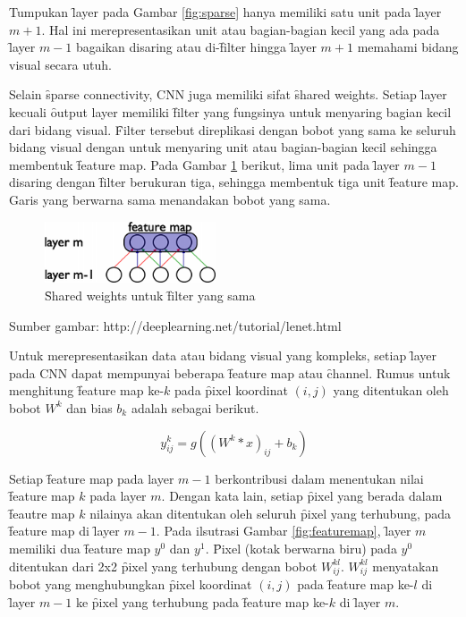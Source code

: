 Tumpukan \f{layer} pada Gambar \ref{fig:sparse} hanya memiliki satu unit pada \f{layer} $m + 1$. Hal ini merepresentasikan unit atau bagian-bagian kecil yang ada pada \f{layer} $m - 1$ bagaikan disaring atau di-\f{filter} hingga \f{layer} $m + 1$ memahami bidang visual secara utuh. 

Selain \f{sparse connectivity}, CNN juga memiliki sifat \f{shared weights}. Setiap \f{layer} kecuali \f{output layer} memiliki \f{filter} yang fungsinya untuk menyaring bagian kecil dari bidang visual. \f{Filter} tersebut direplikasi dengan bobot yang sama ke seluruh bidang visual dengan untuk menyaring unit atau bagian-bagian kecil sehingga membentuk \f{feature map}. Pada Gambar \ref{fig:shared} berikut, lima unit pada \f{layer} $m - 1$ disaring dengan \f{filter} berukuran tiga, sehingga membentuk tiga unit \f{feature map}. Garis yang berwarna sama menandakan bobot yang sama.

\begin{figure}
	\centering
	\includegraphics[width=0.45\textwidth,height=0.15\textwidth]
	{pics/shared.png}
	\caption{\f{Shared weights} untuk \f{filter} yang sama}
	\label{fig:shared}
\end{figure}
\vspace{-1.2cm}
\begin{center}
	{\small Sumber gambar: http://deeplearning.net/tutorial/lenet.html}
\end{center}

Untuk merepresentasikan data atau bidang visual yang kompleks, setiap \f{layer} pada CNN dapat mempunyai beberapa \f{feature map} atau \f{channel}. Rumus untuk menghitung \f{feature map} ke-$k$ pada \f{pixel} koordinat $(i,j)$ yang ditentukan oleh bobot $W^{k}$ dan bias $b_{k}$ adalah sebagai berikut.

\begin{equation}
\label{equ:featuremap}
y^{k}_{ij} = g\left((W^{k} * x)_{ij} + b_{k}\right)
\end{equation}

Setiap \f{feature map} pada layer $m - 1$ berkontribusi dalam menentukan nilai \f{feature map} $k$ pada layer $m$. Dengan kata lain, setiap \f{pixel} yang berada dalam \f{feautre map} $k$ nilainya akan ditentukan oleh seluruh \f{pixel} yang terhubung, pada \f{feature map} di \f{layer} $m - 1$. Pada ilsutrasi Gambar \ref{fig:featuremap}, \f{layer} $m$ memiliki dua \f{feature map} $y^0$ dan $y^1$. \f{Pixel} (kotak berwarna biru) pada $y^0$ ditentukan dari 2x2 \f{pixel} yang terhubung dengan bobot $W^{kl}_{ij}$. $W^{kl}_{ij}$ menyatakan bobot yang menghubungkan \f{pixel} koordinat $(i,j)$ pada \f{feature map} ke-$l$ di \f{layer} $m - 1$ ke \f{pixel} yang terhubung pada \f{feature map} ke-$k$ di \f{layer} $m$.


